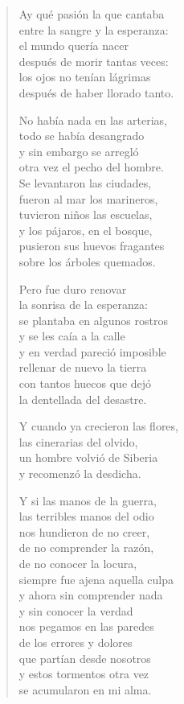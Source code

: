 \documentclass[12pt]{article}
\begin{document}
\clearpage
{}
\begin{verse}

Ay qué pasión la que cantaba\\
entre la sangre y la esperanza:\\
el mundo quería nacer\\
después de morir tantas veces:\\
los ojos no tenían lágrimas\\
después de haber llorado tanto.  

No había nada en las arterias,\\
todo se había desangrado\\
y sin embargo se arregló\\
otra vez el pecho del hombre.\\
Se levantaron las ciudades,\\
fueron al mar los marineros,\\
tuvieron niños las escuelas,\\
y los pájaros, en el bosque,\\
pusieron sus huevos fragantes\\
sobre los árboles quemados.  

Pero fue duro renovar\\
la sonrisa de la esperanza:\\
se plantaba en algunos rostros\\
y se les caía a la calle\\
y en verdad pareció imposible\\
rellenar de nuevo la tierra\\
con tantos huecos que dejó\\
la dentellada del desastre.  

Y cuando ya crecieron las flores,\\
las cinerarias del olvido,\\
un hombre volvió de Siberia\\
y recomenzó la desdicha.  

Y si las manos de la guerra,\\
las terribles manos del odio\\
nos hundieron de no creer,\\
de no comprender la razón,\\
de no conocer la locura,\\
siempre fue ajena aquella culpa\\
y ahora sin comprender nada\\
y sin conocer la verdad\\
nos pegamos en las paredes\\
de los errores y dolores\\
que partían desde nosotros\\
y estos tormentos otra vez\\
se acumularon en mi alma.  

\end{verse}
\end{document}
